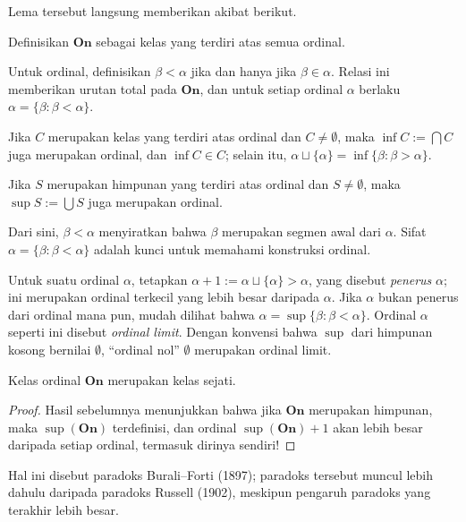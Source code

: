 Lema tersebut langsung memberikan akibat berikut.
\begin{theorem}\label{prop:On-wellorder}
	Definisikan $\textbf{On}$ sebagai kelas yang terdiri atas semua ordinal. 
	\begin{compactitem}
		\item Untuk ordinal, definisikan $\beta < \alpha$ jika dan hanya jika $\beta \in \alpha$. Relasi ini memberikan urutan total pada $\textbf{On}$, dan untuk setiap ordinal $\alpha$ berlaku $\alpha = \{ \beta : \beta < \alpha \}$.
		\item Jika $C$ merupakan kelas yang terdiri atas ordinal dan $C \neq \emptyset$, maka $\inf C := \bigcap C$ juga merupakan ordinal, dan $\inf C \in C$; selain itu, $\alpha \sqcup \{\alpha\} = \inf\{ \beta: \beta > \alpha \}$.
		\item Jika $S$ merupakan himpunan yang terdiri atas ordinal dan $S \neq \emptyset$, maka $\sup S := \bigcup S$ juga merupakan ordinal.
	\end{compactitem}
\end{theorem}
Dari sini, $\beta < \alpha$ menyiratkan bahwa $\beta$ merupakan segmen awal dari $\alpha$. Sifat $\alpha = \{\beta: \beta < \alpha \}$ adalah kunci untuk memahami konstruksi ordinal.

Untuk suatu ordinal $\alpha$, tetapkan $\alpha + 1 := \alpha \sqcup \{\alpha\} > \alpha$, yang disebut \emph{penerus} $\alpha$; ini merupakan ordinal terkecil yang lebih besar daripada $\alpha$. Jika $\alpha$ bukan penerus dari ordinal mana pun, mudah dilihat bahwa $\alpha = \sup\{\beta: \beta < \alpha\}$. Ordinal $\alpha$ seperti ini disebut \emph{ordinal limit}. Dengan konvensi bahwa $\sup$ dari himpunan kosong bernilai $\emptyset$, ``ordinal nol'' $\emptyset$ merupakan ordinal limit.

\begin{proposition}\label{prop:Ord-class}
	Kelas ordinal $\textbf{On}$ merupakan kelas sejati.
\end{proposition}
\begin{proof}
	Hasil sebelumnya menunjukkan bahwa jika $\textbf{On}$ merupakan himpunan, maka $\sup(\textbf{On})$ terdefinisi, dan ordinal $\sup(\textbf{On}) + 1$ akan lebih besar daripada setiap ordinal, termasuk dirinya sendiri!
\end{proof}
Hal ini disebut paradoks Burali--Forti (1897); paradoks tersebut muncul lebih dahulu daripada paradoks Russell (1902), meskipun pengaruh paradoks yang terakhir lebih besar.

